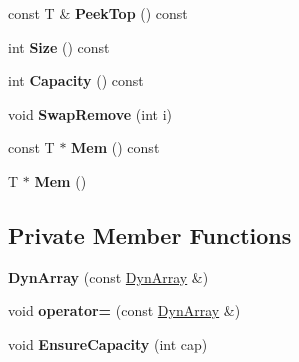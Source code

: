 \begin{DoxyCompactItemize}
\mbox{\label{classtinyxml2_1_1DynArray_a5e4e1e408e646688503dec77c77c9d59}} 
const T \& {\bfseries Peek\+Top} () const
\item 
\mbox{\label{classtinyxml2_1_1DynArray_a67614d80847eb92cab330f1a5849a9a2}} 
int {\bfseries Size} () const
\item 
\mbox{\label{classtinyxml2_1_1DynArray_a8e101fdf5b4248ac119d7dca6d0f5421}} 
int {\bfseries Capacity} () const
\item 
\mbox{\label{classtinyxml2_1_1DynArray_aa72c644f8b5e9ec5dab5b66c88f5665f}} 
void {\bfseries Swap\+Remove} (int i)
\item 
\mbox{\label{classtinyxml2_1_1DynArray_a60b33e61cf10b3fd900ee46692dc0fe9}} 
const T $\ast$ {\bfseries Mem} () const
\item 
\mbox{\label{classtinyxml2_1_1DynArray_a2f0842cd666e2ad951f1a8bd6561fa40}} 
T $\ast$ {\bfseries Mem} ()
\end{DoxyCompactItemize}
\subsection*{Private Member Functions}
\begin{DoxyCompactItemize}
\item 
\mbox{\label{classtinyxml2_1_1DynArray_a8e2251588f079f2e7a4080b2c53dabea}} 
{\bfseries Dyn\+Array} (const \mbox{\hyperlink{classtinyxml2_1_1DynArray}{Dyn\+Array}} \&)
\item 
\mbox{\label{classtinyxml2_1_1DynArray_a46fa3bff1a6abe7cafad46707d0bb890}} 
void {\bfseries operator=} (const \mbox{\hyperlink{classtinyxml2_1_1DynArray}{Dyn\+Array}} \&)
\item 
\mbox{\label{classtinyxml2_1_1DynArray_a30f2dec82744b45667452e6ce3d51e32}} 
void {\bfseries Ensure\+Capacity} (int cap)
\end{DoxyCompactItemize}
